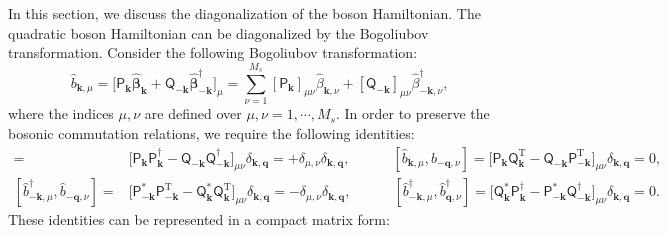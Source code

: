\documentclass[aps, prx, nofootinbib, superscriptaddress]{revtex4-2}
\begin{document}
In this section, we discuss the diagonalization of the boson Hamiltonian. 
The quadratic boson Hamiltonian can be diagonalized by the Bogoliubov transformation. 
Consider the following Bogoliubov transformation:
\begin{equation}
    \hat{b}_{\mathbf{k}, \mu} 
    = \big[ \mathsf{P}_{\mathbf{k}}^{\phantom \dagger} \hat{\bm \beta}_{\mathbf{k}}^{\phantom \dagger} + \mathsf{Q}_{-\mathbf{k}}^{\phantom \dagger} \hat{\bm \beta}_{-\mathbf{k}}^{\dagger} \big]_{\mu}
    = \sum_{\nu = 1}^{M_s} [\mathsf{P}_{\mathbf{k}}]_{\mu\nu}^{\phantom \dagger} \hat{\beta}_{\mathbf{k}, \nu}^{\phantom \dagger} + [\mathsf{Q}_{-\mathbf{k}}]_{\mu\nu}^{\phantom \dagger} \hat{\beta}_{-\mathbf{k}, \nu}^{\dagger},
\end{equation}
where the indices $\mu, \nu$ are defined over $\mu, \nu = 1, \cdots, M_s$.
In order to preserve the bosonic commutation relations, we require the following identities:
\begin{align*}
    [\hat{b}_{  \mathbf{k}, \mu}^{\phantom \dagger}, \hat{b}_{  \mathbf{q}, \nu}^{\dagger}] 
    = & \big[ \mathsf{P}_{\mathbf{k}}\mathsf{P}_{\mathbf{k}}^{\dagger} - \mathsf{Q}_{-\mathbf{k}}\mathsf{Q}_{-\mathbf{k}}^{\dagger} \big]_{\mu\nu} \delta_{\mathbf{k},\mathbf{q}}
    = + \delta_{\mu,\nu}    \delta_{\mathbf{k}, \mathbf{q}} ,
    \qquad \quad
    [\hat{b}_{  \mathbf{k}, \mu}, \hat{b}_{-\mathbf{q}, \nu}] 
    = \big[ \mathsf{P}_{\mathbf{k}}\mathsf{Q}_{\mathbf{k}}^{\mathrm{T}} - \mathsf{Q}_{-\mathbf{k}}\mathsf{P}_{-\mathbf{k}}^{\mathrm{T}} \big]_{\mu\nu} \delta_{\mathbf{k},\mathbf{q}} = 0, \\
    [\hat{b}_{-\mathbf{k}, \mu}^{\dagger}, \hat{b}_{-\mathbf{q}, \nu}^{\phantom \dagger}] 
    = & \big[ \mathsf{P}_{-\mathbf{k}}^{*}\mathsf{P}_{-\mathbf{k}}^{\mathrm{T}} - \mathsf{Q}_{\mathbf{k}}^{*}\mathsf{Q}_{\mathbf{k}}^{\mathrm{T}} \big]_{\mu\nu} \delta_{\mathbf{k},\mathbf{q}}
    = - \delta_{\mu,\nu}    \delta_{\mathbf{k}, \mathbf{q}}, 
    \qquad \quad
    [\hat{b}_{-\mathbf{k}, \mu}^{\dagger}, \hat{b}_{  \mathbf{q}, \nu}^{\dagger}] 
    = \big[ \mathsf{Q}_{\mathbf{k}}^{*}\mathsf{P}_{\mathbf{k}}^{\dagger} - \mathsf{P}_{-\mathbf{k}}^{*}\mathsf{Q}_{-\mathbf{k}}^{\dagger} \big]_{\mu\nu} \delta_{\mathbf{k},\mathbf{q}}
    = 0.
\end{align*}
These identities can be represented in a compact matrix form:
\end{document}
